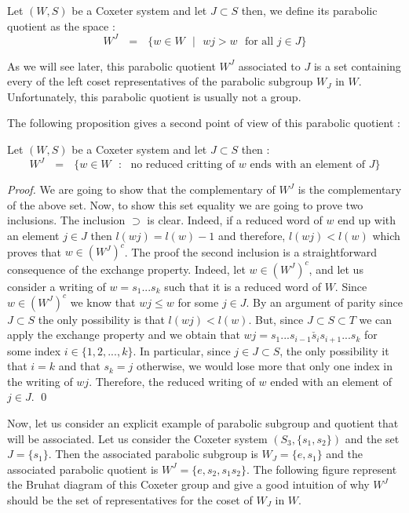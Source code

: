 \documentclass[envcountsame,envcountchap]{svmono}
\newcommand{\sub}{\subset}
\newcommand{\qq}{\text{ }}
\begin{document}
\begin{definition}
	Let $(W,S)$ be a Coxeter system and let $J\sub S$ then, we define its parabolic quotient as the space :
	\begin{equation}
	W^J\qq=\qq\{w\in W\qq \lvert\qq wj>w\qq \mbox{for all }j\in J\}
	\end{equation}
\end{definition}

As we will see later, this parabolic quotient $W^J$ associated to $J$ is a set containing every of the left coset representatives of the parabolic subgroup $W_J$ in $W$. Unfortunately, this parabolic quotient is usually not a group.

	
The following proposition gives a second point of view of this parabolic quotient :
\begin{proposition}
	Let $(W,S)$ be a Coxeter system and let $J\sub S$ then :
	\begin{equation}
	W^J\qq=\qq\{w\in W\qq :\qq \mbox{no reduced critting of } w \mbox{ ends with an element of }J\}
	\end{equation}
\end{proposition}
\begin{proof}
	We are going to show that the complementary of $W^J$ is the complementary of the above set. Now, to show this set equality we are going to prove two inclusions. The inclusion $\supset$ is clear. Indeed, if a reduced word of $w$ end up with an element $j\in J$ then $l(wj)=l(w)-1$ and therefore, $l(wj)<l(w)$ which proves that $w\in (W^J)^c$. The proof the second inclusion is a straightforward consequence of the exchange property. Indeed, let $w\in (W^J)^c$, and let us consider a writing of $w=s_1...s_k$ such that it is a reduced word of $W$. Since $w\in (W^J)^c$ we know that $wj\leq w$ for some $j\in J$. By an argument of parity since $J\sub S$ the only possibility is that $l(wj)<l(w)$. But, since $J\sub S\sub T$ we can apply the exchange property and we obtain that $wj=s_1...s_{i-1}\check{s_i}s_{i+1}...s_k$ for some index $i\in \{1,2,...,k\}$. In particular, since $j\in J\sub S$, the only possibility it that $i=k$ and that $s_k=j$ otherwise, we would lose more that only one index in the writing of $wj$. Therefore, the reduced writing of $w$ ended with an element of $j\in J$. \qed
\end{proof}
Now, let us consider an explicit example of parabolic subgroup and quotient that will be associated. Let us consider the Coxeter system $(S_3,\{s_1,s_2\})$ and the set $J=\{s_1\}$. Then the associated parabolic subgroup is $W_J=\{e,s_1\}$ and the associated parabolic quotient is $W^J=\{e,s_2,s_1s_2\}$. The following figure represent the Bruhat diagram of this Coxeter group and give a good intuition of why $W^J$ should be the set of representatives for the coset of $W_J$ in $W$.
\end{document}
